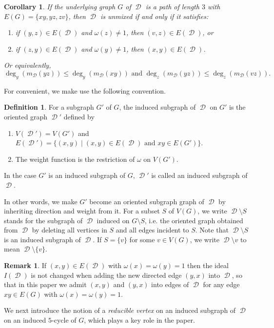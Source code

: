 \documentclass[12pt, amscd]{amsart}
\newtheorem{cor}[thm]{Corollary}
\theoremstyle{definition}
\newtheorem{defn}[thm]{Definition}
\newtheorem{rem}[thm]{Remark}
\DeclareMathOperator{\D}{\mathcal{D}}
\newcommand{\0}{\bold{0}}
\begin{document}
\begin{cor}\label{corP4} If the underlying graph $G$ of $\D$ is a path of length $3$ with $E(G) = \{xy,yz,zv\}$, then $\D$ is unmixed if and only if it satisfies:
\begin{enumerate}
\item if $(y,z)\in E(\D)$ and $\omega(z)\ne 1$, then $(v,z)\in E(\D)$, or
\item if $(z,y)\in E(\D)$ and $\omega(y)\ne 1$, then $(x,y)\in E(\D)$.
\end{enumerate}
Or equivalently, $$\deg_y(m_{\D}(yz)) \leqslant \deg_y(m_{\D}(xy)) \text{ and } \deg_z(m_{\D}(yz)) \leqslant \deg_z(m_{\D}(vz)).$$
\end{cor}

\medskip

For convenient, we make use the following convention.

\begin{defn} For a subgraph $G'$ of $G$, the induced subgraph of $\D$ on $G'$ is the oriented graph $\D'$ defined by
\begin{enumerate}
\item $V(\D') = V(G')$ and $E(\D')=\{(x,y) \mid (x,y)\in E(\D) \text{ and }  xy \in E(G')\}$.
\item The weight function is the restriction of $\omega$ on $V(G')$.
\end{enumerate}
In the case $G'$ is an induced subgraph of $G$, $\D'$ is called an induced subgraph of $\D$. 
\end{defn}

In other words, we make $G'$ become an oriented subgraph graph of $\D$ by inheriting direction and weight from it. For a subset $S$ of $V(G)$, we write $\D\setminus S$ stands for the  subgraph of $\D$ induced on $G\setminus S$, i.e. the oriented graph obtained from $\D$ by deleting all vertices in $S$ and all edges incident to $S$. Note that $\D \setminus S$ is an induced subgraph of $\D$. If $S=\{v\}$ for some $v\in V(G)$, we write $\D\setminus v$ to mean $\D\setminus \{v\}$.

\medskip

\begin{rem} If $(x,y)\in E(\D)$ with $\omega(x)=\omega(y)=1$ then the ideal $I(\D)$ is not changed when adding the new directed edge $(y,x)$ into $\D$, so that in this paper we admit $(x,y)$ and $(y,x)$ into edges of $\D$ for any edge $xy\in E(G)$ with $\omega(x)=\omega(y)=1$.
\end{rem}

We next introduce the notion of a {\it reducible vertex} on an induced subgraph of $\D$ on an induced $5$-cycle of $G$, which plays a key role in the paper. 
\end{document}
